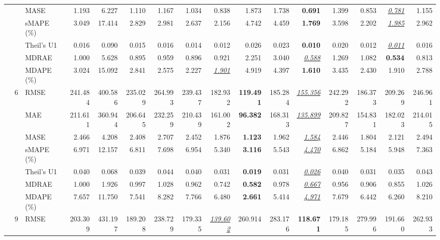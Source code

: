 \begin{table}[!htbp]
{\begin{tabular}{lllrrrrrrrrrrrrr}
 &  & MASE & 1.193 & 6.227 & 1.110 & 1.167 & 1.034 & 0.838 & 1.873 & 1.738 & \textbf{0.691} & 1.399 & 0.853 & \underline{\textit{0.781}} & 1.155 \\
 &  & sMAPE (\%) & 3.049 & 17.414 & 2.829 & 2.981 & 2.637 & 2.156 & 4.742 & 4.459 & \textbf{1.769} & 3.598 & 2.202 & \underline{\textit{1.985}} & 2.962 \\
 &  & Theil's U1 & 0.016 & 0.090 & 0.015 & 0.016 & 0.014 & 0.012 & 0.026 & 0.023 & \textbf{0.010} & 0.020 & 0.012 & \underline{\textit{0.011}} & 0.016 \\
 &  & MDRAE & 1.000 & 5.628 & 0.895 & 0.959 & 0.896 & 0.921 & 2.251 & 3.040 & \underline{\textit{0.588}} & 1.269 & 1.082 & \textbf{0.534} & 0.813 \\
 &  & MDAPE (\%) & 3.024 & 15.092 & 2.841 & 2.575 & 2.227 & \underline{\textit{1.901}} & 4.919 & 4.397 & \textbf{1.610} & 3.435 & 2.430 & 1.910 & 2.788 \\
\cmidrule(lr){2-16}
 & 6 & RMSE & 241.484 & 400.586 & 235.029 & 264.993 & 239.437 & 182.932 & \textbf{119.491} & 185.284 & \underline{\textit{155.356}} & 242.292 & 186.373 & 209.269 & 246.961 \\
 &  & MAE & 211.611 & 360.944 & 206.645 & 232.259 & 210.439 & 161.002 & \textbf{96.382} & 168.313 & \underline{\textit{135.899}} & 209.827 & 154.831 & 182.023 & 214.015 \\
 &  & MASE & 2.466 & 4.208 & 2.408 & 2.707 & 2.452 & 1.876 & \textbf{1.123} & 1.962 & \underline{\textit{1.584}} & 2.446 & 1.804 & 2.121 & 2.494 \\
 &  & sMAPE (\%) & 6.971 & 12.157 & 6.811 & 7.698 & 6.954 & 5.340 & \textbf{3.116} & 5.543 & \underline{\textit{4.470}} & 6.862 & 5.184 & 5.948 & 7.363 \\
 &  & Theil's U1 & 0.040 & 0.068 & 0.039 & 0.044 & 0.040 & 0.031 & \textbf{0.019} & 0.031 & \underline{\textit{0.026}} & 0.040 & 0.031 & 0.035 & 0.043 \\
 &  & MDRAE & 1.000 & 1.926 & 0.997 & 1.028 & 0.962 & 0.742 & \textbf{0.582} & 0.978 & \underline{\textit{0.667}} & 0.956 & 0.906 & 0.855 & 1.026 \\
 &  & MDAPE (\%) & 7.657 & 11.750 & 7.541 & 8.282 & 7.766 & 6.480 & \textbf{2.661} & 5.414 & \underline{\textit{4.971}} & 7.679 & 6.442 & 6.260 & 8.210 \\
\cmidrule(lr){2-16}
 & 9 & RMSE & 203.309 & 431.197 & 189.208 & 238.729 & 179.335 & \underline{\textit{139.602}} & 260.914 & 283.176 & \textbf{118.671} & 179.185 & 279.996 & 191.660 & 262.933 \\

\end{tabular}}
\end{table}
